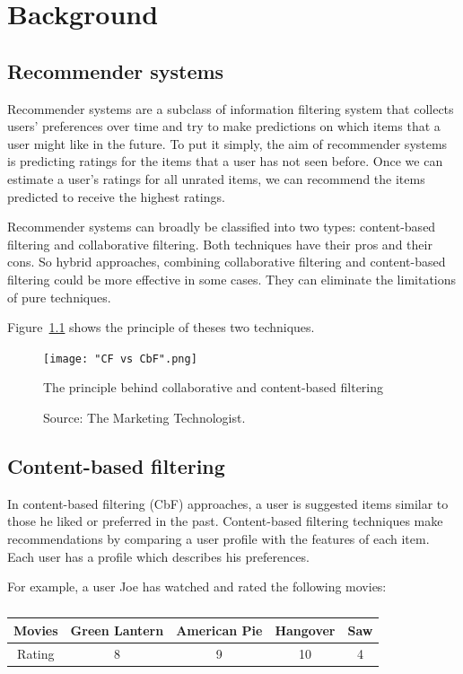 \documentclass[oneside,13pt]{extreport}
\begin{document}
\chapter{Background}
\label{backgroud_chapter}
\section{Recommender systems}
Recommender systems are a subclass of information filtering system that collects users’ preferences over time and try to make predictions on which items that a user might like in the future. To put it simply, the aim of recommender systems is predicting ratings for the items that a user has not seen before. Once we can estimate a user's ratings for all unrated items, we can recommend the items predicted to receive the highest ratings.

Recommender systems can broadly be classified into two types: content-based filtering and collaborative filtering. Both techniques have their pros and their cons. So hybrid approaches, combining collaborative filtering and content-based filtering could be more effective in some cases. They can eliminate the limitations of pure techniques.

Figure~\ref{fig:CF vs CbF} shows the principle of theses two techniques.
\clearpage
\begin{figure}[h!]
    \centering
    \texttt{[image: "CF vs CbF".png]} 
    \caption{The principle behind collaborative and content-based filtering}
    \!\!\!\!
    \caption*{Source: The Marketing Technologist.}
    \label{fig:CF vs CbF}
\end{figure}

\section{Content-based filtering}
In content-based filtering (CbF) approaches, a user is suggested items similar to those he liked or preferred in the past. Content-based filtering techniques  make recommendations by comparing a user profile with the features of each item. Each user has a profile which describes his preferences.  

For example, a user Joe has watched and rated the following movies: 
\begin{table}[h!]
    \small\centering
    \begin{tabular}{|c|c|c|c|c|}
        \hline
        Movies & Green Lantern & American Pie & Hangover & Saw   \\
        \hline
        Rating & 8 & 9 & 10 & 4 \\
        \hline
    \end{tabular}
    \caption*{}
\end{table}
\end{document}
